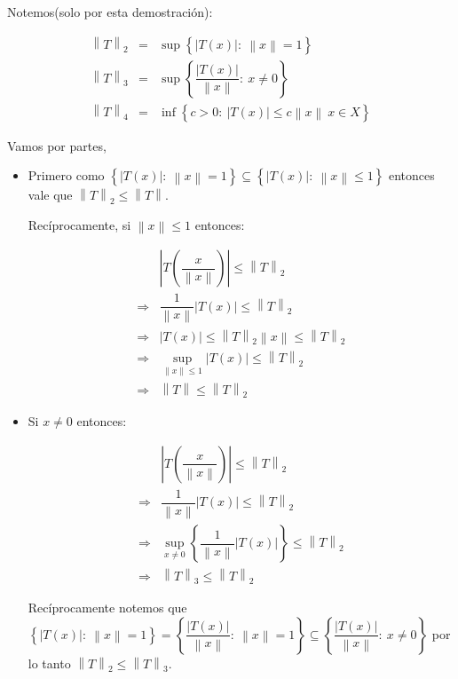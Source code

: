 \documentclass[11pt]{article}
\newcommand{\norm}[1]{\left\lVert#1\right\rVert}
\newcommand{\abs}[1]{\left\lvert#1\right\rvert}
\newcommand{\sett}[1]{\left\lbrace#1\right\rbrace}
\numberwithin{theorem}{subsection}
\newenvironment{proof}[1][Demostraci\'on]{\begin{trivlist}
		\item[\hskip \labelsep {\bfseries #1}]}{\end{trivlist}}
\begin{document}
\begin{proof}
	Notemos(solo por esta demostraci\'on):
	
	\[
	\begin{array}{ccc}
	\norm{T}_2 & = & \sup \sett{\abs{T(x)}: \ \norm{x} = 1} \\
	\norm{T}_3 & = & \sup \sett{\dfrac{\abs{T(x)}}{\norm{x}}: \ x \neq 0} \\
	\norm{T}_4 & =  & \inf \sett{c > 0: \ \abs{T(x)} \leq c \norm{x} \ x \in X}
	\end{array}
	\]
	
	Vamos por partes, 
	
	\begin{itemize}
		\item Primero como $\sett{\abs{T(x)}: \ \norm{x} = 1} \subseteq \sett{\abs{T(x)}: \ \norm{x} \leq 1}$ entonces vale que $\norm{T}_2 \leq \norm{T}$. 
		
		Rec\'iprocamente, si $\norm{x} \leq 1$ entonces:
		
		\begin{equation*}
		\begin{array}{cc}
		& \abs{T\left(\dfrac{x}{\norm{x}}\right)} \leq \norm{T}_2 \\
		\Longrightarrow &	\dfrac{1}{\norm{x}}\abs{T(x)} \leq \norm{T}_2 \\
		\Longrightarrow &	\abs{T(x)} \leq \norm{T}_2 \norm{x} \leq \norm{T}_2 \\
		\Longrightarrow &	\sup\limits_{\norm{x} \leq 1} \abs{T(x)} \leq \norm{T}_2 \\
		\Longrightarrow &	\norm{T} \leq \norm{T}_2
		\end{array}
		\end{equation*}
		
		\item Si $x \neq 0$ entonces:
		
		\begin{equation*}
		\begin{array}{cc}
		& \abs{T\left(\dfrac{x}{\norm{x}}\right)}  \leq \norm{T}_2 \\
		\Longrightarrow &	\dfrac{1}{\norm{x}}\abs{T(x)} \leq \norm{T}_2 \\
		\Longrightarrow &	\sup\limits_{x \neq 0} \sett{\dfrac{1}{\norm{x}}\abs{T(x)}} \leq \norm{T}_2 \\
		\Longrightarrow &	\norm{T}_3 \leq \norm{T}_2
		\end{array}
		\end{equation*}
		
		Rec\'iprocamente notemos que $\sett{\abs{T(x)}: \ \norm{x} = 1} = \sett{\dfrac{\abs{T(x)}}{\norm{x}}: \ \norm{x} = 1} \subseteq \sett{\dfrac{\abs{T(x)}}{\norm{x}}: \ x \neq 0}$ por lo tanto $\norm{T}_2 \leq \norm{T}_3$.
		

\end{itemize}
\end{proof}
\end{document}
